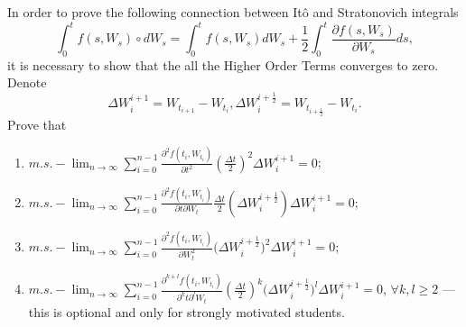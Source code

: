     \problem
    \begin{question}
        In order to prove the following connection between It\^o and Stratonovich integrals
        \[\int_0^t f(s,W_s) \circ dW_s=\int_0^t f(s,W_s) dW_s+\frac{1}{2}\int_0^t \frac{\partial f(s,W_s)}{\partial W_s} ds,\]
        it is necessary to show that the all the Higher Order Terms converges to zero.  Denote
        \[\Delta W^{i+1}_{i}=W_{t_{i+1}}-W_{t_i}, \Delta W^{i+\frac{1}{2}}_{i}=W_{t_{i+\frac{1}{2}}}-W_{t_i}.\]
        Prove that
        \begin{enumerate}[label=(\alph*)]
        \item $m.s.-\lim_{n\rightarrow \infty}\sum_{i=0}^{n-1} \frac{\partial^2 f(t_i,W_{t_i})}{\partial t^2}(\frac{\Delta t}{2})^2\Delta W^{i+1}_{i}=0$;
        \item $m.s.-\lim_{n\rightarrow \infty}\sum_{i=0}^{n-1} \frac{\partial^2 f(t_i,W_{t_i})}{\partial t\partial W_t}\frac{\Delta t}{2}(\Delta W^{i+\frac{1}{2}}_{i}) \Delta W^{i+1}_{i}=0$;
        \item $m.s.-\lim_{n\rightarrow \infty}\sum_{i=0}^{n-1} \frac{\partial^2 f(t_i,W_{t_i})}{\partial W^2_t}\big(\Delta W^{i+\frac{1}{2}}_{i}\big)^2\Delta W^{i+1}_{i}=0$;
        \item  $m.s.-\lim_{n\rightarrow \infty}\sum_{i=0}^{n-1} \frac{\partial^{k+l} f(t_i,W_{t_i})}{\partial^k t \partial^l W_t}(\frac{\Delta t}{2})^k\big(\Delta W^{i+\frac{1}{2}}_{i}\big)^l\Delta W^{i+1}_{i}=0$, $\forall k,l\geq 2$
        ---this is optional and only for strongly motivated students.
        \end{enumerate}
    \end{question}
    \newcommand{\ptt}[1]{%
        \frac{\partial^2f(t_{#1},W_{t_{#1}})}{\partial t^2}
    }
    \newcommand{\dw}[1]{\Delta W_{#1}^{#1+1}}
    \newcommand{\dws}[1]{\Delta W_{#1}^{#1+\frac{1}{2}}}
